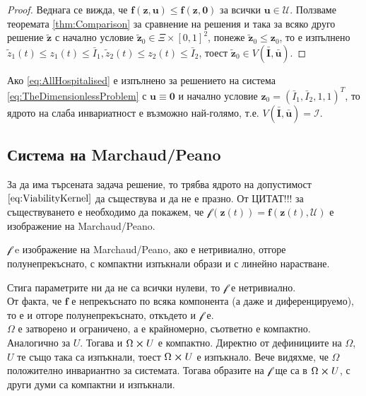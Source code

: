 \begin{proof}
  Веднага се вижда, че $\mathbf{f}(\mathbf{z}, \mathbf{u}) \leq \mathbf{f}(\mathbf{z}, \mathbf{0})$ за всички $\mathbf{u} \in \mathscr{U}$.
  Ползваме теоремата \ref{thm:Comparison} за сравнение на решения и така за всяко друго решение $\tilde{\mathbf{z}}$ с начално условие $\tilde{\mathbf{z}}_0 \in \Xi \times [0, 1]^2$, понеже $\tilde{\mathbf{z}}_0 \leq \mathbf{z}_0$, то е изпълнено $\tilde{z}_1(t) \leq z_1(t) \leq \bar{I}_1, \tilde{z}_2(t) \leq z_2(t) \leq \bar{I}_2$, тоест $\tilde{\mathbf{z}}_0 \in V(\bar{\mathbf{I}}, \bar{\mathbf{u}})$.
\end{proof}

\begin{corollary}
  Ако \ref{eq:AllHospitalised} е изпълнено за решението на система \ref{eq:TheDimensionlessProblem} с $\mathbf{u} \equiv \mathbf{0}$ и начално условие $\mathbf{z}_0 = (\bar{I}_1, \bar{I}_2, 1, 1)^T$, то ядрото на слаба инвариатност е възможно най-голямо, т.е. $V(\bar{\mathbf{I}}, \bar{\mathbf{u}}) = \mathscr{I}$.
\end{corollary}

\subsection{Система на Marchaud/Peano}
За да има търсената задача решение, то трябва ядрото на допустимост $\eqref{eq:ViabilityKernel}$ да съществува и да не е празно. От \color{Red} ЦИТАТ!!!
\color{Black} за съществуването е необходимо да покажем, че $\mathscr{f}(\mathbf{z}(t))=\mathbf{f}(\mathbf{z}(t), \mathscr{U})$ е изображение на Marchaud/Peano.

$\mathscr{f}$ e изображение на Marchaud/Peano, ако е нетривиално, отгоре полунепрекъснато, с компактни изпъкнали образи и с линейно нарастване.

Стига параметрите ни да не са всички нулеви, то $\mathscr{f}$ е нетривиално. \\
От факта, че $\mathbf{f}$ е непрекъснато по всяка компонента (а даже и диференцируемо), то е и отгоре полунепрекъснато, откъдето и $\mathscr{f}$ е. \\
$\Omega$ е затворено и ограничено, а е крайномерно, съответно е компактно. Аналогично за $U$. Тогава и $\Omega \cross U$ е компактно. Директно от дефинициите на $\Omega$, $U$ те също така са изпъкнали, тоест $\Omega \cross U$ е изпъкнало. Вече видяхме, че $\Omega$ положително инвариантно за системата. Тогава образите на $\mathscr{f}$ ще са в $\Omega \cross U$, с други думи са компактни и изпъкнали. \\

